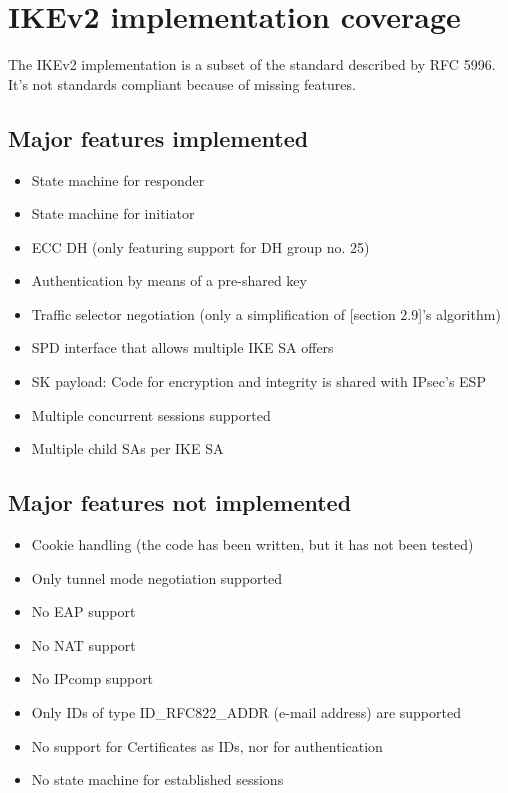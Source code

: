 \documentclass[final,a4paper,twoside,11pt,onecolumn]{report}
\begin{document}
\section{IKEv2 implementation coverage}
\label{sec:ike-impl-coverage}
The IKEv2 implementation is a subset of the standard described by RFC 5996. It's not standards compliant because of missing features.

\subsection{Major features implemented}
\begin{itemize}
   \item State machine for responder
   \item State machine for initiator
   \item ECC DH (only featuring support for DH group no. 25)
   \item Authentication by means of a pre-shared key
   \item Traffic selector negotiation (only a simplification of \citep{rfc5996}[section 2.9]'s algorithm)
   \item SPD interface that allows multiple IKE SA offers
   \item SK payload: Code for encryption and integrity is shared with IPsec's ESP
   \item Multiple concurrent sessions supported
   \item Multiple child SAs per IKE SA
\end{itemize}

\subsection{Major features not implemented}
\begin{itemize}
   \item Cookie handling (the code has been written, but it has not been tested)
   \item Only tunnel mode negotiation supported
   \item No EAP support
   \item No NAT support
   \item No IPcomp support
   \item Only IDs of type ID\_RFC822\_ADDR (e-mail address) are supported
   \item No support for Certificates as IDs, nor for authentication
   \item No state machine for established sessions
\end{itemize}
\end{document}
